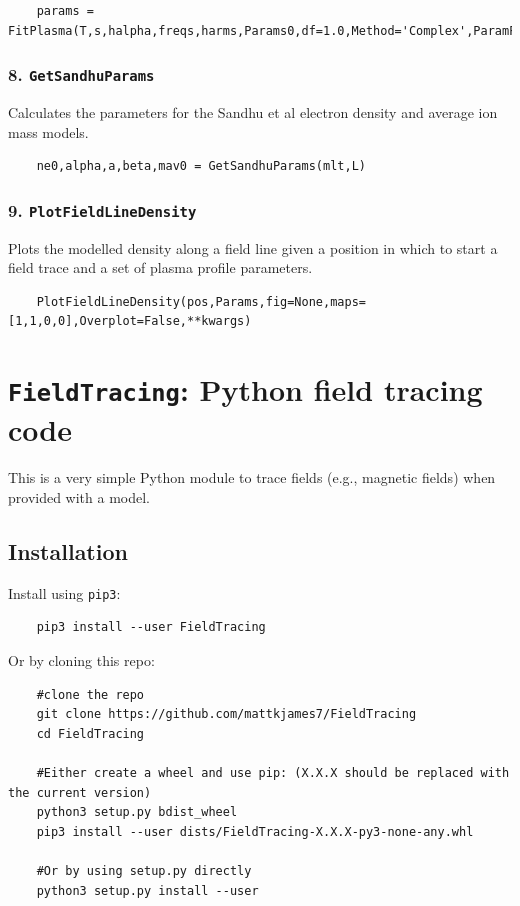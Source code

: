 	\begin{verbatim}
	params = FitPlasma(T,s,halpha,freqs,harms,Params0,df=1.0,Method='Complex',ParamFit=None)
	\end{verbatim}
	
	\subsubsection{8. \texttt{GetSandhuParams}}
	
	Calculates the parameters for the Sandhu et al electron density and 
	average ion mass models.
	
	\begin{verbatim}
	ne0,alpha,a,beta,mav0 = GetSandhuParams(mlt,L)
	\end{verbatim}
	
	\subsubsection{9. \texttt{PlotFieldLineDensity}}
	
	Plots the modelled density along a field line given a position in which
	to start a field trace and a set of plasma profile parameters.
	
	\begin{verbatim}
	PlotFieldLineDensity(pos,Params,fig=None,maps=[1,1,0,0],Overplot=False,**kwargs)
	\end{verbatim}
	
	
	
	\section{\texttt{FieldTracing}: Python field tracing code}
	

	This is a very simple Python module to trace fields (e.g., magnetic fields) when provided with a model.
	
	\subsection{Installation}
	
	Install using \texttt{pip3}:
	
	\begin{verbatim}
	pip3 install --user FieldTracing
	\end{verbatim}
	
	Or by cloning this repo:
	
	\begin{verbatim}
	#clone the repo
	git clone https://github.com/mattkjames7/FieldTracing
	cd FieldTracing
	
	#Either create a wheel and use pip: (X.X.X should be replaced with the current version)
	python3 setup.py bdist_wheel
	pip3 install --user dists/FieldTracing-X.X.X-py3-none-any.whl
	
	#Or by using setup.py directly
	python3 setup.py install --user
	\end{verbatim}
	
